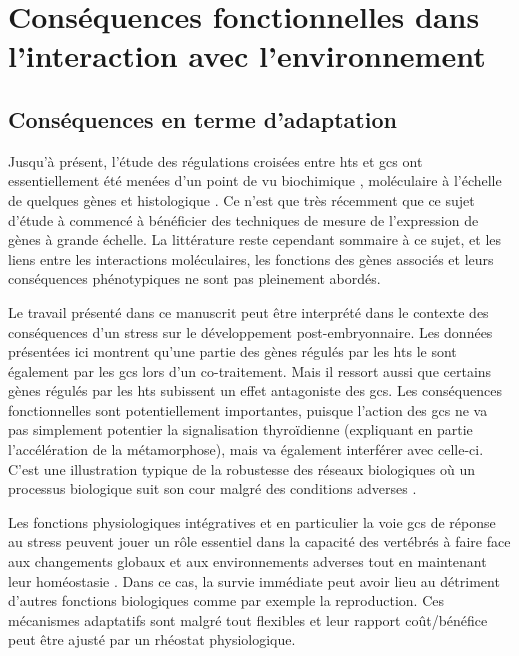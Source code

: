 \documentclass[../main.tex]{subfiles}
\begin{document}
\chapter{Conséquences fonctionnelles dans l'interaction avec l'environnement}


\section{Conséquences en terme d'adaptation}

	Jusqu'à présent, l'étude des régulations croisées entre \glspl{ht} et \glspl{gc} ont essentiellement été menées d'un point de vu biochimique \citep{Kikuyama1982,Galton1990}, moléculaire à l’échelle de quelques gènes \citep{Bagamasbad2008,Krain2004,Gil-Ibanez2014} et histologique \citep{Denver1993}.
	Ce n’est que très récemment que ce sujet d'étude à commencé à bénéficier des techniques de mesure de l'expression de gènes à grande échelle.
	La littérature reste cependant sommaire à ce sujet, et les liens entre les interactions moléculaires, les fonctions des gènes associés et leurs conséquences phénotypiques ne sont pas pleinement abordés.
	\par
	Le travail présenté dans ce manuscrit peut être interprété dans le contexte des conséquences d'un stress sur le développement post-embryonnaire.
	Les données présentées ici montrent qu'une partie des gènes régulés par les \glspl{ht} le sont également par les \glspl{gc} lors d'un co-traitement.
	Mais il ressort aussi que certains gènes régulés par les \glspl{ht} subissent un effet antagoniste des \glspl{gc}.
	Les conséquences fonctionnelles sont potentiellement importantes, puisque l'action des \glspl{gc} ne va pas simplement potentier la signalisation thyroïdienne (expliquant en partie l'accélération de la métamorphose), mais va également interférer avec celle-ci.
	C'est une illustration typique de la robustesse des réseaux biologiques où un processus biologique suit son cour malgré des conditions adverses \citep{Kitano2004}.
	\par
	Les fonctions physiologiques intégratives et en particulier la voie \glspl{gc} de réponse au stress peuvent jouer un rôle essentiel dans la capacité des vertébrés à faire face aux changements globaux et aux environnements adverses tout en maintenant leur homéostasie \citep{Angelier2013}.
	Dans ce cas, la survie immédiate peut avoir lieu au détriment d'autres fonctions biologiques comme par exemple la reproduction. Ces mécanismes adaptatifs sont malgré tout flexibles et leur rapport coût/bénéfice peut être ajusté par un rhéostat physiologique.
\end{document}
